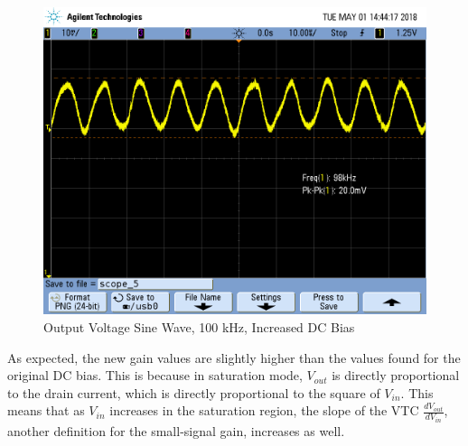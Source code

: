 \FloatBarrier

\begin{figure}[h!]
	\centering
	\includegraphics[scale=0.3]{./images/SCOPE_5.PNG}
	\caption{Output Voltage Sine Wave, 100 \si{\kilo\hertz}, Increased DC Bias}
	\label{fig:100khz_original}
\end{figure}

\FloatBarrier

As expected, the new gain values are slightly higher than the values found for the original DC bias.
This is because in saturation mode, $V_{out}$ is directly proportional to the drain current, which is directly proportional to the square of $V_{in}$. This means that as $V_{in}$ increases in the saturation region, the slope of the VTC $\frac{dV_{out}}{dV_{in}}$, another definition for the small-signal gain, increases as well. \\

